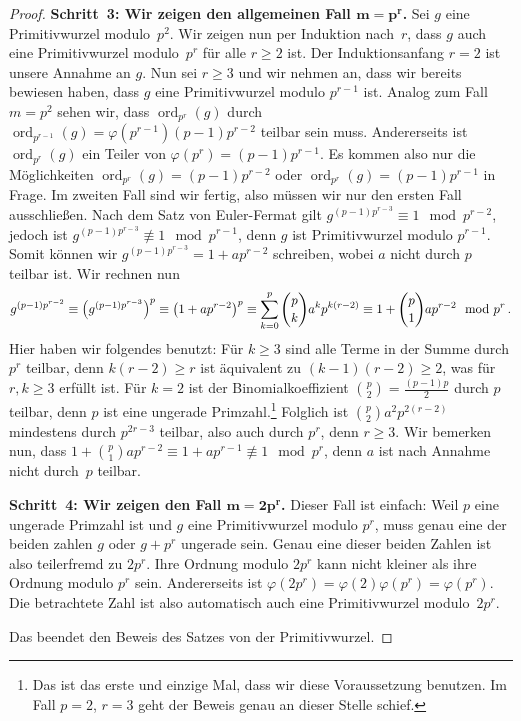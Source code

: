\begin{proof}
	\textbf{Schritt~3: Wir zeigen den allgemeinen Fall $\boldsymbol{m=p^r}$.} Sei $g$ eine Primitivwurzel modulo~$p^2$. Wir zeigen nun per Induktion nach~$r$, dass $g$ auch eine Primitivwurzel modulo~$p^r$ für alle $r\geqslant 2$ ist. Der Induktionsanfang $r=2$ ist unsere Annahme an $g$. Nun sei $r\geqslant 3$ und wir nehmen an, dass wir bereits bewiesen haben, dass $g$ eine Primitivwurzel modulo $p^{r-1}$ ist. Analog zum Fall $m=p^2$ sehen wir, dass $\operatorname{ord}_{p^r}(g)$ durch $\operatorname{ord}_{p^{r-1}}(g)=\varphi(p^{r-1})(p-1)p^{r-2}$ teilbar sein muss. Andererseits ist $\operatorname{ord}_{p^r}(g)$ ein Teiler von $\varphi(p^r)=(p-1)p^{r-1}$. Es kommen also nur die Möglichkeiten $\operatorname{ord}_{p^r}(g)=(p-1)p^{r-2}$ oder $\operatorname{ord}_{p^r}(g)=(p-1)p^{r-1}$ in Frage. Im zweiten Fall sind wir fertig, also müssen wir nur den ersten Fall ausschließen. Nach dem Satz von Euler-Fermat gilt $g^{(p-1)p^{r-3}}\equiv 1\mod p^{r-2}$, jedoch ist $g^{(p-1)p^{r-3}}\not\equiv1\mod p^{r-1}$, denn $g$ ist Primitivwurzel modulo $p^{r-1}$. Somit können wir $g^{(p-1)p^{r-3}}=1+ap^{r-2}$ schreiben, wobei $a$ nicht durch $p$ teilbar ist. Wir rechnen nun
	\begin{equation*}
		g^{(p-1)p^{r-2}}\equiv \parens*{g^{(p-1)p^{r-3}}}^p\equiv \parens*{1+ap^{r-2}}^{p}\equiv\sum_{k=0}^{p}\binom{p}{k}a^kp^{k(r-2)}\equiv 1+\binom{p}{1}ap^{r-2}\mod p^r\,.
	\end{equation*}
	Hier haben wir folgendes benutzt: Für $k\geqslant 3$ sind alle Terme in der Summe durch $p^r$ teilbar, denn $k(r-2)\geqslant r$ ist äquivalent zu $(k-1)(r-2)\geqslant 2$, was für $r,k\geqslant 3$ erfüllt ist. Für $k=2$ ist der Binomialkoeffizient $\binom{p}{2}=\frac{(p-1)p}{2}$ durch $p$ teilbar, denn $p$ ist eine ungerade Primzahl.\footnote{Das ist das erste und einzige Mal, dass wir diese Voraussetzung benutzen. Im Fall $p=2$, $r=3$ geht der Beweis genau an dieser Stelle schief.} Folglich ist $\binom{p}{2}a^2p^{2(r-2)}$ mindestens durch $p^{2r-3}$ teilbar, also auch durch $p^r$, denn $r\geqslant3$. Wir bemerken nun, dass $1+\binom{p}{1}ap^{r-2}\equiv 1+ap^{r-1}\not\equiv 1\mod p^r$, denn $a$ ist nach Annahme nicht durch~$p$ teilbar.
	
	\textbf{Schritt~4: Wir zeigen den Fall $\boldsymbol{m=2p^r}$.} Dieser Fall ist einfach: Weil $p$ eine ungerade Primzahl ist und $g$ eine Primitivwurzel modulo $p^r$, muss genau eine der beiden zahlen $g$ oder $g+p^r$ ungerade sein. Genau eine dieser beiden Zahlen ist also teilerfremd zu $2p^r$. Ihre Ordnung modulo $2p^r$ kann nicht kleiner als ihre Ordnung modulo $p^r$ sein. Andererseits ist  $\varphi(2p^r)=\varphi(2)\varphi(p^r)=\varphi(p^r)$. Die betrachtete Zahl ist also automatisch auch eine Primitivwurzel modulo~$2p^r$.
	
	Das beendet den Beweis des Satzes von der Primitivwurzel.
\end{proof}

